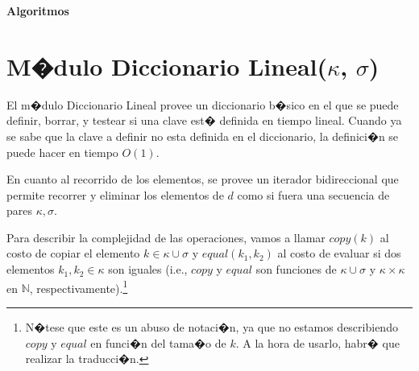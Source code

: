 \documentclass[a4paper,10pt]{article}
\newenvironment{Algoritmos}{%
  \vspace*{2ex}%
  \noindent\textbf{\Large Algoritmos}%
  \vspace*{2ex}%
}{}
\begin{document}
\begin{Algoritmos}
  
\end{Algoritmos}

\section{M�dulo Diccionario Lineal($\kappa$, $\sigma$)}

El m�dulo Diccionario Lineal provee un diccionario b�sico en el que se puede definir, borrar, y testear si una clave est� definida en tiempo lineal.  Cuando ya se sabe que la clave a definir no esta definida en el diccionario, la definici�n se puede hacer en tiempo $O(1)$.

En cuanto al recorrido de los elementos, se provee un iterador bidireccional que permite recorrer y eliminar los elementos de $d$ como si fuera una secuencia de pares $\kappa,\sigma$.

Para describir la complejidad de las operaciones, vamos a llamar $copy(k)$ al costo de copiar el elemento $k \in \kappa \cup \sigma$ y $equal(k_1, k_2)$ al costo de evaluar si dos elementos $k_1, k_2 \in \kappa$ son iguales (i.e., $copy$ y $equal$ son funciones de $\kappa \cup \sigma$ y $\kappa \times \kappa$ en $\mathbb{N}$, respectivamente).\footnote{N�tese que este es un abuso de notaci�n, ya que no estamos describiendo $copy$ y $equal$ en funci�n del tama�o de $k$.  A la hora de usarlo, habr� que realizar la traducci�n.}
\end{document}
